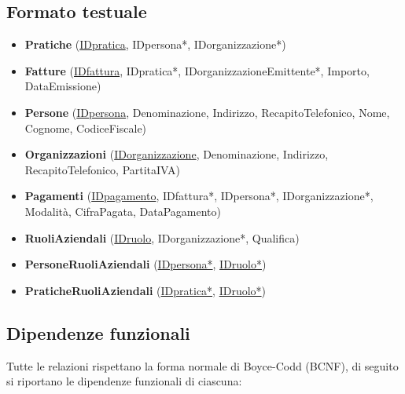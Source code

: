 \documentclass[a4paper,12pt]{article}
\begin{document}
 \subsection{ Formato testuale }

\begin{itemize}
\item \textbf{Pratiche} (\underline{IDpratica}, IDpersona*, IDorganizzazione*)

\item \textbf{Fatture} (\underline{IDfattura}, IDpratica*, IDorganizzazioneEmittente*, Importo, DataEmissione)

\item \textbf{Persone} (\underline{IDpersona}, Denominazione, Indirizzo, RecapitoTelefonico, Nome, Cognome, CodiceFiscale)

\item \textbf{Organizzazioni} (\underline{IDorganizzazione}, Denominazione, Indirizzo, RecapitoTelefonico, PartitaIVA)

\item \textbf{Pagamenti} (\underline{IDpagamento}, IDfattura*, IDpersona*, IDorganizzazione*, Modalità, CifraPagata, DataPagamento)

\item \textbf{RuoliAziendali} (\underline{IDruolo}, IDorganizzazione*, Qualifica)

\item \textbf{PersoneRuoliAziendali} (\underline{IDpersona*}, \underline{IDruolo*})

\item \textbf{PraticheRuoliAziendali} (\underline{IDpratica*}, \underline{IDruolo*})
\end{itemize}


 \subsection{ Dipendenze funzionali }

Tutte le relazioni rispettano la forma normale di Boyce-Codd (BCNF), di seguito si riportano le dipendenze funzionali di ciascuna:
\end{document}
